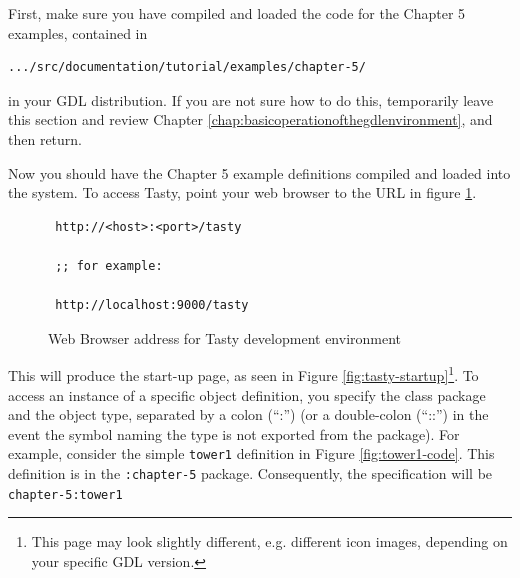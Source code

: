 \documentclass [11pt]{book}
\begin{document}
First, make sure you have compiled and loaded the code for
the Chapter 5 examples, contained in 

\begin{verbatim}.../src/documentation/tutorial/examples/chapter-5/
\end{verbatim} in your GDL distribution. If you are not sure how to do this,
temporarily leave this section and review Chapter 
\ref{chap:basicoperationofthegdlenvironment}, and then return.



Now you should have the Chapter 5 example definitions
compiled and loaded into the system. To access Tasty, point your web
browser to the URL in figure
\ref{fig:tasty-toplevel-url}.
\begin{figure}
\begin{lrbox}{\boxedverb}
\begin{minipage}{\linewidth}

\begin{verbatim}
 http://<host>:<port>/tasty

 ;; for example:

 http://localhost:9000/tasty
\end{verbatim}
\end{minipage}
\end{lrbox}
\fbox{\usebox{\boxedverb}}

\caption{Web Browser address for Tasty development environment}

\label{fig:tasty-toplevel-url}

\end{figure}
This will produce the start-up page, as seen in Figure 
\ref{fig:tasty-startup}\footnote{This page may look slightly different, e.g. different
icon images, depending on your specific GDL version.}. To access an instance of a specific object definition,
you specify the class package and the object type, separated by a
colon (``:'') (or a double-colon (``::'') in the event the symbol
naming the type is not exported from the package). For example,
consider the simple \texttt{tower1} definition in Figure 
\ref{fig:tower1-code}. This definition is in the \texttt{:chapter-5} package. Consequently, the specification will be \texttt{chapter-5:tower1}
\end{document}
